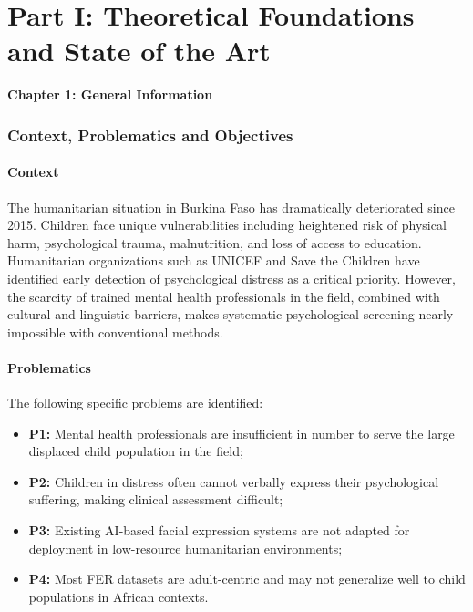\documentclass[a4paper,12pt,oneside]{report}
\begin{document}
\part*{Part I: Theoretical Foundations and State of the Art}

\newpage
\thispagestyle{fancy}
{\LARGE \bfseries \noindent Chapter 1: General Information}
\vspace{2em}
\renewcommand{\thesection}{\Roman{section}}
\justifying

\section{Context, Problematics and Objectives}

\subsection{Context}

The humanitarian situation in Burkina Faso has dramatically deteriorated since
2015. Children face unique vulnerabilities including heightened risk of physical
harm, psychological trauma, malnutrition, and loss of access to education.
Humanitarian organizations such as UNICEF and Save the Children have identified
early detection of psychological distress as a critical priority. However, the
scarcity of trained mental health professionals in the field, combined with
cultural and linguistic barriers, makes systematic psychological screening
nearly impossible with conventional methods.

\subsection{Problematics}

The following specific problems are identified:

\begin{itemize}
    \item \textbf{P1:} Mental health professionals are insufficient in number to
    serve the large displaced child population in the field;
    \item \textbf{P2:} Children in distress often cannot verbally express their
    psychological suffering, making clinical assessment difficult;
    \item \textbf{P3:} Existing AI-based facial expression systems are not adapted
    for deployment in low-resource humanitarian environments;
    \item \textbf{P4:} Most FER datasets are adult-centric and may not generalize
    well to child populations in African contexts.
\end{itemize}
\end{document}
